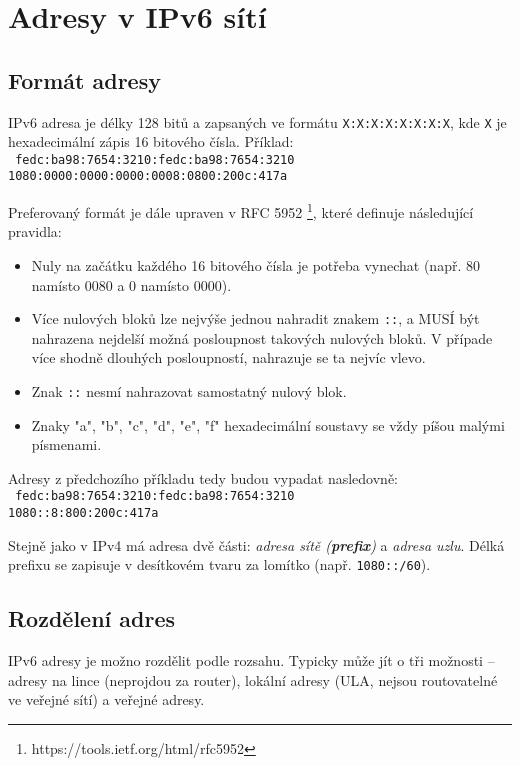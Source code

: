 \documentclass[a4paper,11pt,draft]{article}
\begin{document}
\section{Adresy v IPv6 sítí}

\subsection{Formát adresy}
IPv6 adresa je délky 128 bitů a zapsaných ve formátu {\tt X:X:X:X:X:X:X:X}, kde
{\tt X} je hexadecimální zápis 16 bitového čísla.
Příklad:\\
{\tt
fedc:ba98:7654:3210:fedc:ba98:7654:3210 \\
1080:0000:0000:0000:0008:0800:200c:417a
}

Preferovaný formát je dále upraven v RFC 5952
\footnote{https://tools.ietf.org/html/rfc5952}, které definuje následující
pravidla:
\begin{itemize}
    \item Nuly na začátku každého 16 bitového čísla je potřeba vynechat (např.
        80 namísto 0080 a 0 namísto 0000).
    \item Více nulových bloků lze nejvýše jednou nahradit znakem {\tt ::}, a
        MUSÍ být nahrazena nejdelší možná posloupnost takových nulových bloků.
        V případe více shodně dlouhých posloupností, nahrazuje se ta nejvíc
        vlevo.
    \item Znak {\tt ::} nesmí nahrazovat samostatný nulový blok.
    \item Znaky "a", "b", "c", "d", "e", "f" hexadecimální soustavy se vždy
        píšou malými písmenami.
\end{itemize}
Adresy z předchozího příkladu tedy budou vypadat nasledovně:\\
{\tt
fedc:ba98:7654:3210:fedc:ba98:7654:3210 \\
1080::8:800:200c:417a
}

Stejně jako v IPv4 má adresa dvě části: \emph{adresa sítě ({\bf prefix})} a
\emph{adresa uzlu}. Délká prefixu se zapisuje v desítkovém tvaru za lomítko
(např. {\tt 1080::/60}).

\subsection{Rozdělení adres}
IPv6 adresy je možno rozdělit podle rozsahu. Typicky může jít o tři
možnosti -- adresy na lince (neprojdou za router), lokální adresy (ULA, nejsou
routovatelné ve veřejné sítí) a veřejné adresy.
\end{document}
